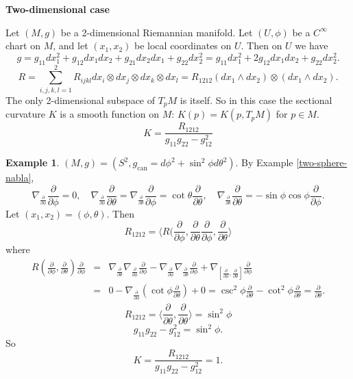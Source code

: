 \documentclass{amsart}
\numberwithin{equation}{section}
\newcommand{\can}{\mathrm{can}}
\theoremstyle{definition}
\newtheorem{example}[definition]{Example}
\theoremstyle{theorem}
\begin{document}
\bigskip
\noindent
{\bf \large Two-dimensional case}

Let $(M,g)$ be a 2-dimensional Riemannian manifold. Let
$(U,\phi)$ be a $C^\infty$ chart on $M$, and let
$(x_1,x_2)$ be local coordinates on $U$. Then on $U$ we have
$$
g=g_{11} dx_1^2 + g_{12} dx_1 dx_2 + g_{21} dx_2 dx_1 + g_{22} dx_2^2 
= g_{11} dx_1^2 + 2g_{12} dx_1 dx_2 + g_{22} dx_2^2.
$$ 
$$
R= \sum_{i,j,k,l=1}^2 R_{ijkl} dx_i \otimes dx_j\otimes dx_k \otimes dx_l = R_{1212} (dx_1\wedge dx_2)\otimes (dx_1\wedge dx_2). 
$$
The only 2-dimensional subspace of $T_pM$ is itself. So in this case the sectional
curvature $K$ is a smooth function on $M$: $K(p)=K(p,T_pM)$ for $p\in M$.
$$
\boxed{ K=\frac{R_{1212}}{g_{11}g_{22}-g_{12}^2} } 
$$


\begin{example}
$(M,g)= (S^2, g_{\can} = d\phi^2 + \sin^2\phi d\theta^2)$. By Example \ref{two-sphere-nabla},
$$
\nabla_{\frac{\partial}{\partial \phi}}\frac{\partial}{\partial \phi}=0,\quad
\nabla_{\frac{\partial}{\partial \phi}}\frac{\partial}{\partial \theta}= 
\nabla_{\frac{\partial}{\partial \theta}}\frac{\partial}{\partial \phi}=\cot\theta\frac{\partial}{\partial\theta},\quad
\nabla_{\frac{\partial}{\partial \theta}}\frac{\partial}{\partial \theta}= -\sin\phi\cos\phi \frac{\partial}{\partial\phi}.
$$ 
Let $(x_1,x_2)=(\phi,\theta)$. Then
$$
R_{1212}= \langle R(\frac{\partial}{\partial \phi},\frac{\partial}{\partial\theta} \frac{\partial}{\partial \phi},\frac{\partial}{\partial\theta}\rangle
$$
where
\begin{eqnarray*}
R(\frac{\partial}{\partial \phi},\frac{\partial}{\partial\theta})\frac{\partial}{\partial \phi}
&=&  \nabla_{\frac{\partial}{\partial \theta}} \nabla_{\frac{\partial}{\partial \phi}}\frac{\partial}{\partial \phi}-
\nabla_{\frac{\partial}{\partial \phi}} \nabla_{\frac{\partial}{\partial \theta}}\frac{\partial}{\partial \phi}
+\nabla_{ [ \frac{\partial}{\partial \phi}, \frac{\partial}{\partial \theta}] } \frac{\partial}{\partial \phi}\\
&=& 0 - \nabla_{\frac{\partial}{\partial \phi}}(\cot \phi\frac{\partial}{\partial \theta}) + 0 
= \csc^2\phi \frac{\partial}{\partial \theta} -\cot^2\phi \frac{\partial}{\partial \theta} =\frac{\partial}{\partial \theta}. 
\end{eqnarray*}
$$
R_{1212}=\langle \frac{\partial}{\partial \theta}, \frac{\partial}{\partial \theta}\rangle = \sin^2\phi
$$
$$
g_{11} g_{22} -g_{12}^2 =\sin^2\phi.
$$
So 
$$
K=\frac{R_{1212}}{g_{11}g_{22}-g_{12}^2}=1.
$$
\end{example}
\end{document}
